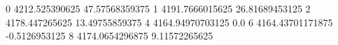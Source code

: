 0 4212.525390625 47.57568359375
1 4191.7666015625 26.81689453125
2 4178.447265625 13.49755859375
4 4164.94970703125 0.0
6 4164.43701171875 -0.5126953125
8 4174.0654296875 9.11572265625
